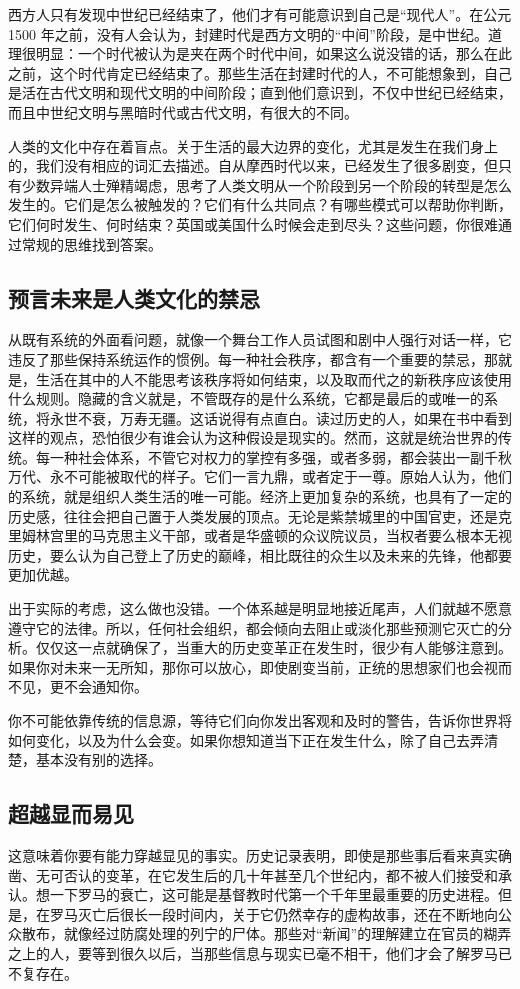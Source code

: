 西方人只有发现中世纪已经结束了，他们才有可能意识到自己是“现代人”。在公元 1500 年之前，没有人会认为，封建时代是西方文明的“中间”阶段，是中世纪。道理很明显：一个时代被认为是夹在两个时代中间，如果这么说没错的话，那么在此之前，这个时代肯定已经结束了。那些生活在封建时代的人，不可能想象到，自己是活在古代文明和现代文明的中间阶段；直到他们意识到，不仅中世纪已经结束，而且中世纪文明与黑暗时代或古代文明，有很大的不同。

人类的文化中存在着盲点。关于生活的最大边界的变化，尤其是发生在我们身上的，我们没有相应的词汇去描述。自从摩西时代以来，已经发生了很多剧变，但只有少数异端人士殚精竭虑，思考了人类文明从一个阶段到另一个阶段的转型是怎么发生的。它们是怎么被触发的？它们有什么共同点？有哪些模式可以帮助你判断，它们何时发生、何时结束？英国或美国什么时候会走到尽头？这些问题，你很难通过常规的思维找到答案。

\subsection{预言未来是人类文化的禁忌}
从既有系统的外面看问题，就像一个舞台工作人员试图和剧中人强行对话一样，它违反了那些保持系统运作的惯例。每一种社会秩序，都含有一个重要的禁忌，那就是，生活在其中的人不能思考该秩序将如何结束，以及取而代之的新秩序应该使用什么规则。隐藏的含义就是，不管既存的是什么系统，它都是最后的或唯一的系统，将永世不衰，万寿无疆。这话说得有点直白。读过历史的人，如果在书中看到这样的观点，恐怕很少有谁会认为这种假设是现实的。然而，这就是统治世界的传统。每一种社会体系，不管它对权力的掌控有多强，或者多弱，都会装出一副千秋万代、永不可能被取代的样子。它们一言九鼎，或者定于一尊。原始人认为，他们的系统，就是组织人类生活的唯一可能。经济上更加复杂的系统，也具有了一定的历史感，往往会把自己置于人类发展的顶点。无论是紫禁城里的中国官吏，还是克里姆林宫里的马克思主义干部，或者是华盛顿的众议院议员，当权者要么根本无视历史，要么认为自己登上了历史的巅峰，相比既往的众生以及未来的先锋，他都要更加优越。

出于实际的考虑，这么做也没错。一个体系越是明显地接近尾声，人们就越不愿意遵守它的法律。所以，任何社会组织，都会倾向去阻止或淡化那些预测它灭亡的分析。仅仅这一点就确保了，当重大的历史变革正在发生时，很少有人能够注意到。如果你对未来一无所知，那你可以放心，即使剧变当前，正统的思想家们也会视而不见，更不会通知你。

你不可能依靠传统的信息源，等待它们向你发出客观和及时的警告，告诉你世界将如何变化，以及为什么会变。如果你想知道当下正在发生什么，除了自己去弄清楚，基本没有别的选择。

\subsection{超越显而易见}
这意味着你要有能力穿越显见的事实。历史记录表明，即使是那些事后看来真实确凿、无可否认的变革，在它发生后的几十年甚至几个世纪内，都不被人们接受和承认。想一下罗马的衰亡，这可能是基督教时代第一个千年里最重要的历史进程。但是，在罗马灭亡后很长一段时间内，关于它仍然幸存的虚构故事，还在不断地向公众散布，就像经过防腐处理的列宁的尸体。那些对“新闻”的理解建立在官员的糊弄之上的人，要等到很久以后，当那些信息与现实已毫不相干，他们才会了解罗马已不复存在。

